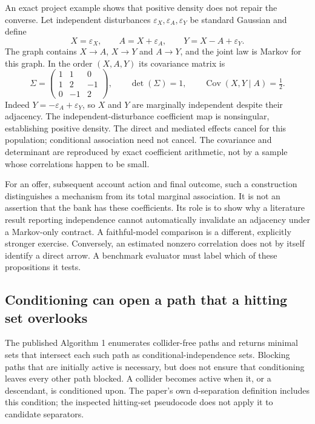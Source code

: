 An exact project example shows that positive density does not repair the
converse. Let independent disturbances $\varepsilon_X,\varepsilon_A,
\varepsilon_Y$ be standard Gaussian and define
\begin{equation}
 X=\varepsilon_X,\qquad A=X+\varepsilon_A,\qquad
 Y=X-A+\varepsilon_Y.
\label{exec17:validity-cancellation}
\end{equation}
The graph contains $X\to A$, $X\to Y$ and $A\to Y$, and the joint law is
Markov for this graph. In the order $(X,A,Y)$ its covariance matrix is
\begin{equation}
 \Sigma=\begin{pmatrix}1&1&0\\1&2&-1\\0&-1&2\end{pmatrix},
 \qquad \det(\Sigma)=1,\qquad
 \operatorname{Cov}(X,Y\mid A)=\tfrac12.
\label{exec17:validity-covariance}
\end{equation}
Indeed $Y=-\varepsilon_A+\varepsilon_Y$, so $X$ and $Y$ are marginally
independent despite their adjacency. The independent-disturbance coefficient
map is nonsingular, establishing positive density. The direct and mediated
effects cancel for this population; conditional association need not cancel.
The covariance and determinant are reproduced by exact coefficient arithmetic,
not by a sample whose correlations happen to be small.
\citep{exec17_advice_validity_exact}

For an offer, subsequent account action and final outcome, such a construction
distinguishes a mechanism from its total marginal association. It is not an
assertion that the bank has these coefficients. Its role is to show why a
literature result reporting independence cannot automatically invalidate an
adjacency under a Markov-only contract. A faithful-model comparison is a
different, explicitly stronger exercise. Conversely, an estimated nonzero
correlation does not by itself identify a direct arrow. A benchmark evaluator
must label which of these propositions it tests.

\subsection{Conditioning can open a path that a hitting set overlooks}

The published Algorithm 1 enumerates collider-free paths and returns minimal
sets that intersect each such path as conditional-independence sets. Blocking
paths that are initially active is necessary, but does not ensure that
conditioning leaves every other path blocked. A collider becomes active when
it, or a descendant, is conditioned upon. The paper's own d-separation
definition includes this condition; the inspected hitting-set pseudocode does
not apply it to candidate separators.~\citep{exec17_benchmark_consistency}

